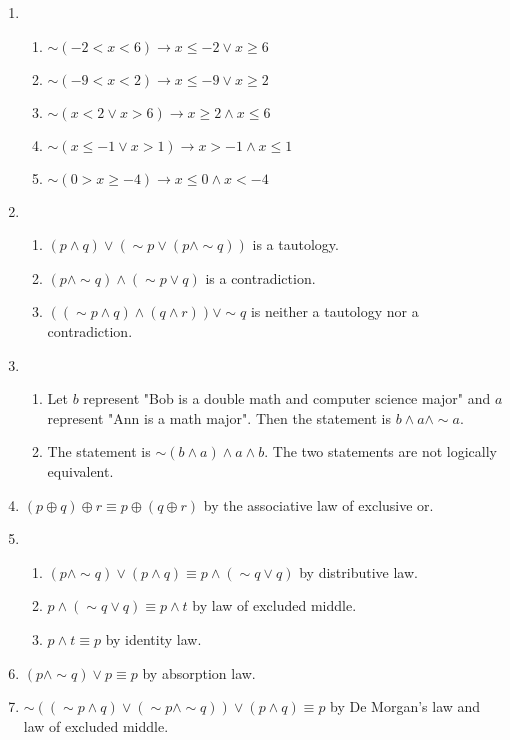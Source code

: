 \documentclass{article}
\begin{document}
\begin{enumerate}
\item
\begin{enumerate}
\item \(\sim (-2 < x < 6) \rightarrow x \leq -2 \lor x \geq 6\)
\item \(\sim (-9 < x < 2) \rightarrow x \leq -9 \lor x \geq 2\)
\item \(\sim (x < 2 \lor x > 6) \rightarrow x \geq 2 \land x \leq 6\)
\item \(\sim (x \leq -1 \lor x > 1) \rightarrow x > -1 \land x \leq 1\)
\item \(\sim (0 > x \geq -4) \rightarrow x \leq 0 \land x < -4\)
\end{enumerate}

\item
\begin{enumerate}
\item \((p \land q) \lor (\sim p \lor (p \land \sim q))\) is a tautology.
\item \((p \land \sim q) \land (\sim p \lor q)\) is a contradiction.
\item \(((\sim p \land q) \land (q \land r)) \lor \sim q\) is neither a tautology nor a contradiction.
\end{enumerate}

\item
\begin{enumerate}
\item Let \(b\) represent "Bob is a double math and computer science major" and \(a\) represent "Ann is a math major". Then the statement is \(b \land a \land \sim a\).
\item The statement is \(\sim (b \land a) \land a \land b\). The two statements are not logically equivalent.
\end{enumerate}

\item \((p \oplus q) \oplus r \equiv p \oplus (q \oplus r)\) by the associative law of exclusive or.

\item
\begin{enumerate}
\item \((p \land \sim q) \lor (p \land q) \equiv p \land (\sim q \lor q)\) by distributive law.
\item \(p \land (\sim q \lor q) \equiv p \land t\) by law of excluded middle.
\item \(p \land t \equiv p\) by identity law.
\end{enumerate}

\item \((p \land \sim q) \lor p \equiv p\) by absorption law.

\item \(\sim ((\sim p \land q) \lor (\sim p \land \sim q)) \lor (p \land q) \equiv p\) by De Morgan's law and law of excluded middle.

\end{enumerate}
\end{document}

